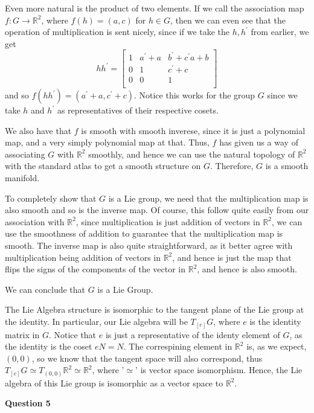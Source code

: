 \documentclass[10pt]{article}
\newcommand{\R}{\mathbb{R}}
\begin{document}
Even more natural is the product of two elements. If we call the association map $f: G \to \R^{2}$, where $f(h) = (a,c)$ for $h\in G$, then we can even see that the operation of multiplication is sent nicely, since if we take the $h,h^{\prime}$ from earlier, we get
\[ hh^{\prime} =
\begin{bmatrix}
  1 & a^{\prime}+ a & b^{\prime}+c^{\prime}a + b \\
  0 & 1 & c^{\prime} + c \\
  0 & 0 & 1 \\
\end{bmatrix}
\]
and so $f(hh^{\prime}) = (a^{\prime} + a,c^{\prime} + c)$. Notice this works for the group $G$ since we take $h$ and $h^{\prime}$ as representatives of their respective cosets.

We also have that $f$ is smooth with smooth inverese, since it is just a polynomial map, and a very simply polynomial map at that. Thus, $f$ has given us a way of associating $G$ with $\R^{2}$ smoothly, and hence we can use the natural topology of $\R^{2}$ with the standard atlas to get a smooth structure on $G$. Therefore, $G$ is a smooth manifold.

To completely show that $G$ is a Lie group, we need that the multiplication map is also smooth and so is the inverse map. Of course, this follow quite easily from our association with $\R^{2}$, since multiplication is just addition of vectors in $\R^{2}$, we can use the smoothness of addition to guarantee that the multiplication map is smooth. The inverse map is also quite straightforward, as it better agree with multiplication being addition of vectors in $\R^{2}$, and hence is just the map that flips the signs of the components of the vector in $\R^{2}$, and hence is also smooth.

We can conclude that $G$ is a Lie Group.

The Lie Algebra structure is isomorphic to the tangent plane of the Lie group at the identity. In particular, our Lie algebra will be $T_{[e]}G$, where $e$ is the identity matrix in $G$. Notice that $e$ is just a representative of the identy element of $G$, as the identity is the coset $eN = N$. The correspining element in $\R^{2}$ is, as we expect, $(0,0)$, so we know that the tangent space will also correspond, thus $T_{[e]}G \simeq T_{(0,0)}\R^{2} \simeq \R^{2}$, where '$\simeq$' is vector space isomorphism. Hence, the Lie algebra of this Lie group is isomorphic as a vector space to $\R^{2}$.

\newpage
\textbf{Question 5}
\end{document}
